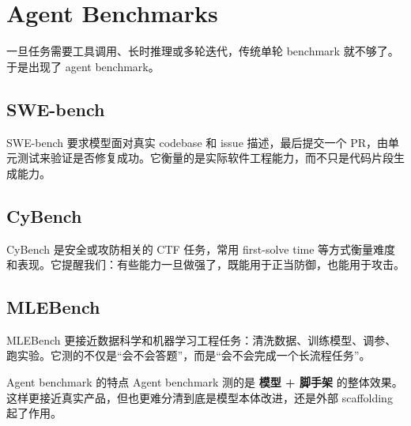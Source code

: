 \section{Agent Benchmarks}

一旦任务需要工具调用、长时推理或多轮迭代，传统单轮 benchmark 就不够了。于是出现了 agent benchmark。

\subsection{SWE-bench}

SWE-bench 要求模型面对真实 codebase 和 issue 描述，最后提交一个 PR，由单元测试来验证是否修复成功。它衡量的是实际软件工程能力，而不只是代码片段生成能力。

\subsection{CyBench}

CyBench 是安全或攻防相关的 CTF 任务，常用 first-solve time 等方式衡量难度和表现。它提醒我们：有些能力一旦做强了，既能用于正当防御，也能用于攻击。

\subsection{MLEBench}

MLEBench 更接近数据科学和机器学习工程任务：清洗数据、训练模型、调参、跑实验。它测的不仅是“会不会答题”，而是“会不会完成一个长流程任务”。

\begin{importantbox}{Agent benchmark 的特点}
Agent benchmark 测的是 \textbf{模型 + 脚手架} 的整体效果。这样更接近真实产品，但也更难分清到底是模型本体改进，还是外部 scaffolding 起了作用。
\end{importantbox}

